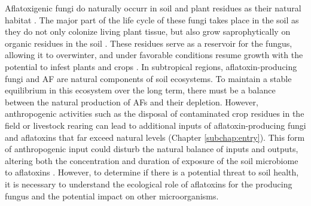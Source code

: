 Aflatoxigenic fungi do naturally occurr in soil and plant residues as their natural habitat \citep{horn2003ecology, jaime2004aspergillus, orum1997spatial, accinelli2008aspergillus}. The major part of the life cycle of these fungi takes place in the soil as they do not only colonize living plant tissue, but also grow saprophytically on organic residues in the soil \citep{abbas2009ecology}. These residues serve as a reservoir for the fungus, allowing it to overwinter, and under favorable conditions resume growth with the potential to infest plants and crops  \citep{horn2003ecology, abbas2009ecology}. In subtropical regions, aflatoxin-producing fungi and AF are natural components of soil ecosystems. To maintain a stable equilibrium in this ecosystem over the long term, there must be a balance between the natural production of AFs and their depletion. However, anthropogenic activities such as the disposal of contaminated crop residues in the field or livestock rearing can lead to additional inputs of aflatoxin-producing fungi and aflatoxins that far exceed natural levels (Chapter \ref{subchap:entry}). This form of anthropogenic input could disturb the natural balance of inputs and outputs, altering both the concentration and duration of exposure of the soil microbiome to aflatoxins \citep{fouche2020aflatoxins}. However, to determine if there is a potential threat to soil health, it is necessary to understand the ecological role of aflatoxins for the producing fungus and the potential impact on other microorganisms. 


